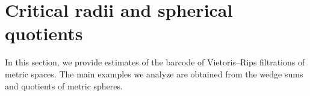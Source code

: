 
\section{Critical radii and spherical quotients}\label{s:barcodes}

In this section, we provide estimates of the barcode of Vietoris--Rips filtrations of metric spaces.
The main examples we analyze are obtained from the wedge sums and quotients of metric spheres.




